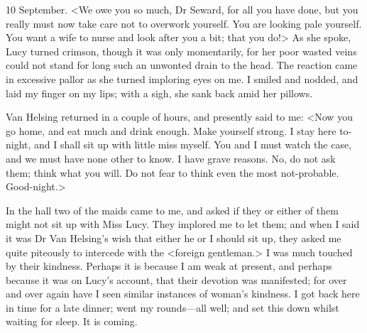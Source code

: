 \begin{diary}{10 September.}
<We owe you so much, Dr Seward, for all you have done, but you really must now take care not to overwork yourself. You are looking pale yourself. You want a wife to nurse and look after you a bit; that you do!> As she spoke, Lucy turned crimson, though it was only momentarily, for her poor wasted veins could not stand for long such an unwonted drain to the head. The reaction came in excessive pallor as she turned imploring eyes on me. I smiled and nodded, and laid my finger on my lips; with a sigh, she sank back amid her pillows.

Van Helsing returned in a couple of hours, and presently said to me: <Now you go home, and eat much and drink enough. Make yourself strong. I stay here to-night, and I shall sit up with little miss myself. You and I must watch the case, and we must have none other to know. I have grave reasons. No, do not ask them; think what you will. Do not fear to think even the most not-probable. Good-night.>

In the hall two of the maids came to me, and asked if they or either of them might not sit up with Miss Lucy. They implored me to let them; and when I said it was Dr Van Helsing's wish that either he or I should sit up, they asked me quite piteously to intercede with the <foreign gentleman.> I was much touched by their kindness. Perhaps it is because I am weak at present, and perhaps because it was on Lucy's account, that their devotion was manifested; for over and over again have I seen similar instances of woman's kindness. I got back here in time for a late dinner; went my rounds—all well; and set this down whilst waiting for sleep. It is coming.
\end{diary}

 

